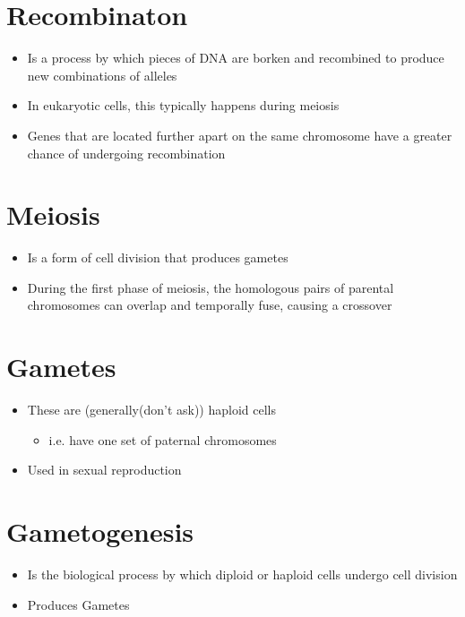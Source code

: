 \documentclass[a4paper]{article}
\begin{document}
\section{Recombinaton}
\label{sec-14}
\begin{itemize}
\item Is a process by which pieces of DNA are borken and recombined to produce new combinations of alleles
\item In eukaryotic cells, this typically happens during meiosis
\item Genes that are located further apart on the same chromosome have a greater chance of undergoing recombination
\end{itemize}


\section{Meiosis}
\label{sec-15}
\begin{itemize}
\item Is a form of cell division that produces gametes
\item During the first phase of meiosis, the homologous pairs of parental chromosomes can overlap and temporally fuse, causing a crossover
\end{itemize}

\section{Gametes}
\label{sec-16}
\begin{itemize}
\item These are (generally(don't ask)) haploid cells 
\begin{itemize}
\item i.e. have one set of paternal chromosomes
\end{itemize}
\item Used in sexual reproduction
\end{itemize}

\section{Gametogenesis}
\label{sec-17}
\begin{itemize}
\item Is the biological process by which diploid or haploid cells undergo cell division
\item Produces Gametes
\end{itemize}
\end{document}
